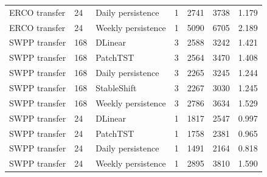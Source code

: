 {\begin{longtable}{llp{5.2cm}rrrr}
ERCO transfer & 24 & Daily persistence & 1 & 2741 & 3738 & 1.179 \\
ERCO transfer & 24 & Weekly persistence & 1 & 5090 & 6705 & 2.189 \\
SWPP transfer & 168 & DLinear & 3 & 2588 & 3242 & 1.421 \\
SWPP transfer & 168 & PatchTST & 3 & 2564 & 3470 & 1.408 \\
SWPP transfer & 168 & Daily persistence & 3 & 2265 & 3245 & 1.244 \\
SWPP transfer & 168 & StableShift & 3 & 2267 & 3030 & 1.245 \\
SWPP transfer & 168 & Weekly persistence & 3 & 2786 & 3634 & 1.529 \\
SWPP transfer & 24 & DLinear & 1 & 1817 & 2547 & 0.997 \\
SWPP transfer & 24 & PatchTST & 1 & 1758 & 2381 & 0.965 \\
SWPP transfer & 24 & Daily persistence & 1 & 1491 & 2164 & 0.818 \\
SWPP transfer & 24 & Weekly persistence & 1 & 2895 & 3810 & 1.590 \\
\bottomrule
\end{longtable}
}
